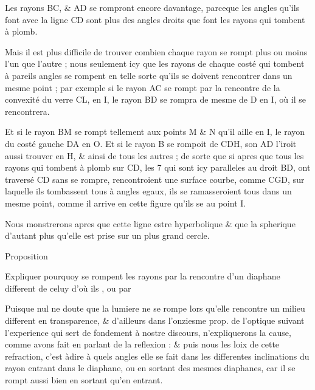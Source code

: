 \documentclass[11pt,a4paper]{article}
\begin{document}
Les rayons BC, \& AD se rompront encore davantage, parceque les angles qu'ils font avec la ligne CD sont plus  \struck{\ill{}} des angles droits que font les rayons qui tombent à plomb.

Mais il est plus difficile de trouver combien chaque rayon se rompt plus ou moins l'un que l'autre ; nous  seulement icy que les rayons de chaque costé qui tombent à pareils angles se rompent en telle sorte qu'ils se doivent rencontrer dans un mesme point ; par exemple \struck{\ill{}} si le rayon AC se rompt par la rencontre de la convexité du verre CL, en I, le rayon BD se rompra de mesme de D en I, où il se rencontrera.

Et si le rayon BM  se rompt tellement aux points M \& N qu'il aille en I, le rayon du costé gauche   DA en O. Et si le rayon B se rompoit de CDH, son  AD l'iroit aussi trouver en H, \& ainsi de tous les autres ; de sorte que si apres que tous les rayons qui tombent à plomb sur CD, \struck{\ill{}}  les 7 qui sont icy paralleles au droit BD, ont \struck{\ill{}} traversé  CD sans se rompre, \struck{\ill{}} rencontroient une surface courbe, comme CGD, sur laquelle ils tombassent tous à angles egaux, ils se ramasseroient tous dans un mesme point, comme il arrive en cette figure qu'ils se   au point I.

Nous \struck{\ill{}} monstrerons apres que cette ligne   estre hyperbolique \& que la \struck{\ill{}} spherique  d'autant plus qu'elle est prise sur un plus grand cercle.

Proposition

Expliquer pourquoy se rompent les rayons par la rencontre d'un diaphane different de celuy d'où ils , ou par \struck{\ill{}}

Puisque nul ne doute que la lumiere ne se rompe lors qu'elle rencontre un milieu different en transparence, \& d'ailleurs \struck{\ill{}}  dans l'onziesme prop. de l'optique suivant l'experience qui sert de fondement à nostre discours,  \struck{\ill{}}  n'expliquerons la cause, comme \struck{\ill{}} avons fait en parlant de la reflexion : \& puis nous    les loix de cette refraction, c'est àdire à quels angles elle se fait  dans les differentes inclinations du rayon entrant dans le diaphane, ou en sortant des mesmes diaphanes, car il se rompt \struck{\ill{}} aussi bien en sortant qu'en entrant.
\end{document}
